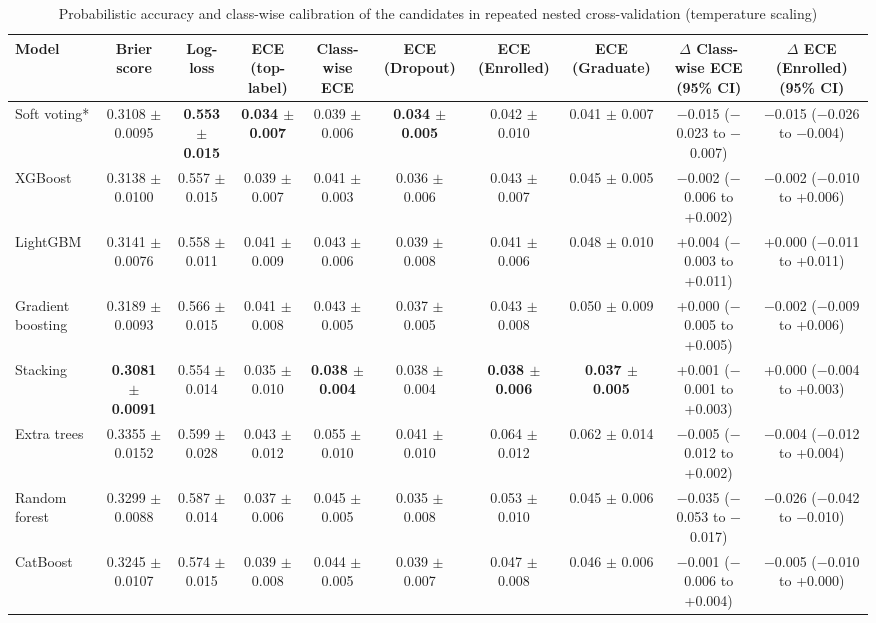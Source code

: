 \begin{table}
\caption{Probabilistic accuracy and class-wise calibration of the candidates in repeated nested cross-validation (temperature scaling)}\label{tab:Table4_calibration_cv}
\footnotesize
\begin{tabular*}{\textwidth}{@{\extracolsep\fill}@{}lccccccccc@{}}
\toprule
Model & Brier score & Log-loss & ECE (top-label) & Class-wise ECE & ECE (Dropout) & ECE (Enrolled) & ECE (Graduate) & $\Delta$ Class-wise ECE (95\% CI) & $\Delta$ ECE (Enrolled) (95\% CI) \\
\midrule
Soft voting* & 0.3108 $\pm$ 0.0095 & \textbf{0.553 $\pm$ 0.015} & \textbf{0.034 $\pm$ 0.007} & 0.039 $\pm$ 0.006 & \textbf{0.034 $\pm$ 0.005} & 0.042 $\pm$ 0.010 & 0.041 $\pm$ 0.007 & $-$0.015 ($-$0.023 to $-$0.007) & $-$0.015 ($-$0.026 to $-$0.004) \\
XGBoost & 0.3138 $\pm$ 0.0100 & 0.557 $\pm$ 0.015 & 0.039 $\pm$ 0.007 & 0.041 $\pm$ 0.003 & 0.036 $\pm$ 0.006 & 0.043 $\pm$ 0.007 & 0.045 $\pm$ 0.005 & $-$0.002 ($-$0.006 to +0.002) & $-$0.002 ($-$0.010 to +0.006) \\
LightGBM & 0.3141 $\pm$ 0.0076 & 0.558 $\pm$ 0.011 & 0.041 $\pm$ 0.009 & 0.043 $\pm$ 0.006 & 0.039 $\pm$ 0.008 & 0.041 $\pm$ 0.006 & 0.048 $\pm$ 0.010 & +0.004 ($-$0.003 to +0.011) & +0.000 ($-$0.011 to +0.011) \\
Gradient boosting & 0.3189 $\pm$ 0.0093 & 0.566 $\pm$ 0.015 & 0.041 $\pm$ 0.008 & 0.043 $\pm$ 0.005 & 0.037 $\pm$ 0.005 & 0.043 $\pm$ 0.008 & 0.050 $\pm$ 0.009 & +0.000 ($-$0.005 to +0.005) & $-$0.002 ($-$0.009 to +0.006) \\
Stacking & \textbf{0.3081 $\pm$ 0.0091} & 0.554 $\pm$ 0.014 & 0.035 $\pm$ 0.010 & \textbf{0.038 $\pm$ 0.004} & 0.038 $\pm$ 0.004 & \textbf{0.038 $\pm$ 0.006} & \textbf{0.037 $\pm$ 0.005} & +0.001 ($-$0.001 to +0.003) & +0.000 ($-$0.004 to +0.003) \\
Extra trees & 0.3355 $\pm$ 0.0152 & 0.599 $\pm$ 0.028 & 0.043 $\pm$ 0.012 & 0.055 $\pm$ 0.010 & 0.041 $\pm$ 0.010 & 0.064 $\pm$ 0.012 & 0.062 $\pm$ 0.014 & $-$0.005 ($-$0.012 to +0.002) & $-$0.004 ($-$0.012 to +0.004) \\
Random forest & 0.3299 $\pm$ 0.0088 & 0.587 $\pm$ 0.014 & 0.037 $\pm$ 0.006 & 0.045 $\pm$ 0.005 & 0.035 $\pm$ 0.008 & 0.053 $\pm$ 0.010 & 0.045 $\pm$ 0.006 & $-$0.035 ($-$0.053 to $-$0.017) & $-$0.026 ($-$0.042 to $-$0.010) \\
CatBoost & 0.3245 $\pm$ 0.0107 & 0.574 $\pm$ 0.015 & 0.039 $\pm$ 0.008 & 0.044 $\pm$ 0.005 & 0.039 $\pm$ 0.007 & 0.047 $\pm$ 0.008 & 0.046 $\pm$ 0.006 & $-$0.001 ($-$0.006 to +0.004) & $-$0.005 ($-$0.010 to +0.000) \\

\end{tabular*}
\end{table}
